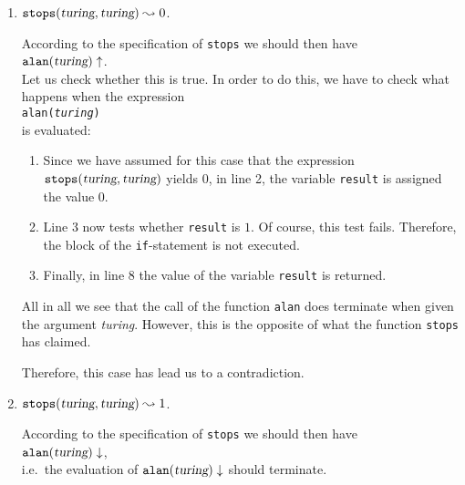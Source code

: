 \begin{enumerate}
\item $\mathtt{stops}(\textsl{turing}, \textsl{turing}) \leadsto 0$. 

      According to the specification of \texttt{stops} we should then have
      \\[0.2cm]
      \hspace*{1.3cm}
      $\mathtt{alan}(\textsl{turing}) \uparrow$.
      \\[0.2cm]
      Let us check whether this is true.  In order to do this, we have to check what happens when
      the expression
      \\[0.2cm]
      \hspace*{1.3cm}
      \texttt{alan(\textsl{turing})} 
      \\[0.2cm]
      is evaluated:
      \begin{enumerate}
      \item Since we have assumed for this case that the expression 
            $\mathtt{stops}(\textsl{turing}, \textsl{turing})$ yields $0$, 
            in line 2, the variable \texttt{result} is assigned the value 0. 
      \item Line 3 now tests whether \texttt{result} is $1$.  Of course,
            this test fails.  Therefore, the block of the \texttt{if}-statement is not executed.
      \item Finally, in line 8 the value of the variable \texttt{result} is returned. 
      \end{enumerate}
      All in all we see that the call of the function \texttt{alan} does terminate when given the argument
      \textsl{turing}.  However, this is the opposite of what the function \texttt{stops} has claimed.
      
      Therefore, this case has lead us to a contradiction.
\item  $\mathtt{stops}(\textsl{turing}, \textsl{turing}) \leadsto 1$. 

      According to the specification of \texttt{stops} we should then have
      \\[0.2cm]
      \hspace*{1.3cm}
      $\mathtt{alan}(\textsl{turing}) \downarrow$, 
      \\[0.2cm]
      i.e.~the evaluation of $\mathtt{alan}(\textsl{turing}) \downarrow$ should terminate.
      

\end{enumerate}
